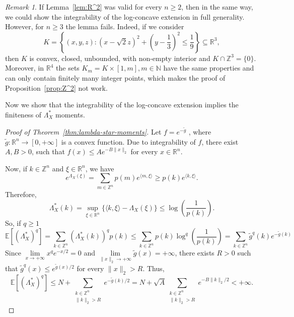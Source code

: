 \documentclass[11pt,a4paper]{article} %
\theoremstyle{definition}
\theoremstyle{remark}
\newtheorem{remark}[theorem]{Remark}
\newcommand{\1}{\mathds{1}}
\begin{document}
\begin{remark}\label{koloun}
    If Lemma~\ref{lem:R^2} was valid for every $n \geq 2$, then in the same way, we could show the integrability of the log-concave extension in full generality. However, for $n\geq 3$ the lemma fails. Indeed, if we consider $$K=\left\{(x,y,z): \left(x-\sqrt{2}z\right)^2+\left(y-\frac{1}{3}\right)^2 \leq \frac{1}{9}\right\} \subseteq \mathbb{R}^3,$$ then $K$ is convex, closed, unbounded, with non-empty interior and $K \cap \mathbb{Z}^3=\{0\}$. Moreover, in $\mathbb{R}^4$ the sets $K_m=K \times [1,m], m \in \mathbb{N}$ have the same properties and can only contain finitely many integer points, which makes the proof of Proposition~\ref{prop:Z^2} not work.
\end{remark}


Now we show that the integrability of the log-concave extension implies the finiteness of $\Lambda_{X}^\ast$ moments.




\begin{proof}[Proof of Theorem~\ref{thm:lambda-star-moments}]
Let $f=e^{-\tilde{g}}$ , where $\tilde{g}:\mathbb{R}^n\to[0,+\infty]$ is a convex function. Due to integrability of $f$, there exist $A,B>0$, such that $f(x) \leq Ae^{-B\|x\|_2}$ for every $x \in \mathbb{R}^n$.

 Now, if $k \in \mathbb{Z}^n$ and $\xi \in \mathbb{R}^n$, we have $$e^{\Lambda_{X}(\xi)}= \sum\limits_{m \in \mathbb{Z}^n} p(m)e^{\langle m,\xi \rangle} \geq p(k)e^{\langle k,\xi \rangle}. $$
Therefore, $$\Lambda_{X}^{\ast}(k)=\sup\limits_{\xi \in \mathbb{R}^n} \{ \langle k, \xi \rangle - \Lambda_{X}(\xi) \} \leq \log \left( \frac{1}{p(k)} \right).$$
So, if $q \geq 1$ $$\mathbb{E}[(\Lambda_{X}^{\ast})^q]= \sum\limits_{k \in \mathbb{Z}^n} (\Lambda_X^{\ast}(k))^q p(k) \leq \sum\limits_{k \in \mathbb{Z}^n} p(k) \log^q\left( \frac{1}{p(k)} \right)= \sum\limits_{k \in \mathbb{Z}^n} \tilde{g}^q(k)e^{-\tilde{g}(k)}$$
Since $\lim\limits_{x\to +\infty} x^qe^{-x/2}=0$ and $\lim\limits_{\|x\|_2\to +\infty} \tilde{g}(x)=+\infty$,  there exists $R>0$ such that $\tilde{g}^q(x)\leq e^{\tilde{g}(x)/2}$ for every $\|x\|_2>R$. Thus,  $$\mathbb{E}[(\Lambda_{X}^{\ast})^q] \leq N +\sum\limits_{\substack{k \in \mathbb{Z}^n \\ \|k\|_2>R}}e^{-\tilde{g}(k)/2}=N+ \sqrt{A}\sum\limits_{\substack{k \in \mathbb{Z}^n \\ \|k\|_2>R}}e^{-B\|k\|_2/2} < +\infty.$$
\end{proof}
\end{document}
